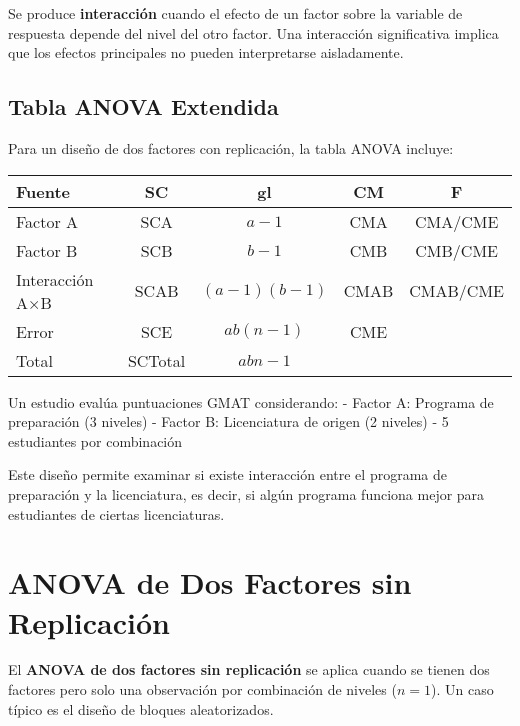 \begin{definition}
Se produce \textbf{interacción} cuando el efecto de un factor sobre la variable de respuesta depende del nivel del otro factor. Una interacción significativa implica que los efectos principales no pueden interpretarse aisladamente.
\end{definition}

\subsection{Tabla ANOVA Extendida}

\begin{theorem}
Para un diseño de dos factores con replicación, la tabla ANOVA incluye:

\begin{center}
\begin{tabular}{lcccc}
\textbf{Fuente} & \textbf{SC} & \textbf{gl} & \textbf{CM} & \textbf{F} \\
\hline
Factor A & SCA & $a-1$ & CMA & CMA/CME \\
Factor B & SCB & $b-1$ & CMB & CMB/CME \\
Interacción A×B & SCAB & $(a-1)(b-1)$ & CMAB & CMAB/CME \\
Error & SCE & $ab(n-1)$ & CME & \\
Total & SCTotal & $abn-1$ & & \\
\end{tabular}
\end{center}
\end{theorem}

\begin{example}
Un estudio evalúa puntuaciones GMAT considerando:
- Factor A: Programa de preparación (3 niveles)
- Factor B: Licenciatura de origen (2 niveles)
- 5 estudiantes por combinación

Este diseño permite examinar si existe interacción entre el programa de preparación y la licenciatura, es decir, si algún programa funciona mejor para estudiantes de ciertas licenciaturas.
\end{example}

\section{ANOVA de Dos Factores sin Replicación}

\begin{definition}
El \textbf{ANOVA de dos factores sin replicación} se aplica cuando se tienen dos factores pero solo una observación por combinación de niveles ($n=1$). Un caso típico es el diseño de bloques aleatorizados.
\end{definition}

